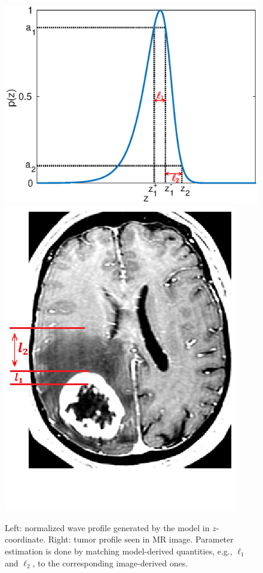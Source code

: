 \documentclass{aims}
\numberwithin{equation}{section}
\begin{document}
\begin{figure}
\begin{center}
\includegraphics[scale=0.56]{plots/waveprofile.eps}\includegraphics[scale=0.33]{plots/MR.png}
\end{center}
\caption{\label{fig:Match wid} Left: normalized wave profile generated by the model in $z$-coordinate. Right: tumor profile seen in MR image. Parameter estimation is done by matching model-derived quantities, e.g., $\ell_1$ and $\ell_2$, to the corresponding image-derived ones. }

\end{figure}
\end{document}
